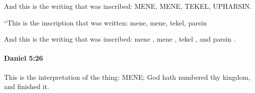 			\begin{versebox}
					\item[BHS] 
					\item[ASV] And this is the writing that was inscribed: MENE, MENE, TEKEL, UPHARSIN.
					\item[NIV] “This is the inscription that was written: mene, mene, tekel, parsin
					\item[NRSV] And this is the writing that was inscribed: mene , mene , tekel , and parsin .
			\end{versebox}

		\paragraph{Daniel 5:26} %
			\label{DANIEL-5-26}

			This is the interpretation of the thing: MENE; God hath numbered thy kingdom, and finished it.

